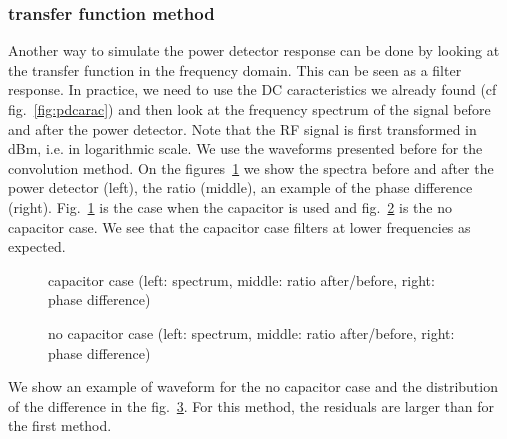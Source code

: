 \newpage
\subsubsection{transfer function method}
Another way  to simulate  the power detector  response can be  done by
looking at the transfer function  in the frequency domain. This can be
seen  as a  filter  response.  In  practice,  we need  to  use the  DC
caracteristics we  already found (cf  fig.~\ref{fig:pdcarac}) and then
look  at the frequency  spectrum of  the signal  before and  after the
power detector.  Note that the  RF signal is first transformed in dBm,
i.e. in logarithmic  scale. We use the waveforms  presented before for
the convolution method.  On  the figures~\ref{fig:pdspec1} we show the
spectra  before  and  after  the  power  detector  (left),  the  ratio
(middle),     an      example     of     the      phase     difference
(right). Fig.~\ref{fig:pdspec1} is the  case when the capacitor is used
and fig.~\ref{fig:pdspec2} is  the no  capacitor  case. We  see that  the
capacitor case filters at lower frequencies as expected.
\begin{figure}[!ht]
  \centering
  \hspace*{-3ex}
  \caption{capacitor case (left: spectrum, middle: ratio after/before, right: phase difference)}
  \label{fig:pdspec1}
\end{figure}

\begin{figure}[!ht]
  \centering
  \hspace*{-3ex}
  \caption{no capacitor case (left: spectrum, middle: ratio after/before, right: phase difference)}
  \label{fig:pdspec2}
\end{figure}
We  show an  example of  waveform for  the no  capacitor case  and the
distribution of  the difference  in the fig.~\ref{fig:m2ex}.  For this
method, the residuals are larger than for the first method.

\begin{figure}[!ht]
  \centering
  \hspace*{-3ex}
  \caption{}
  \label{fig:m2ex}
\end{figure}



